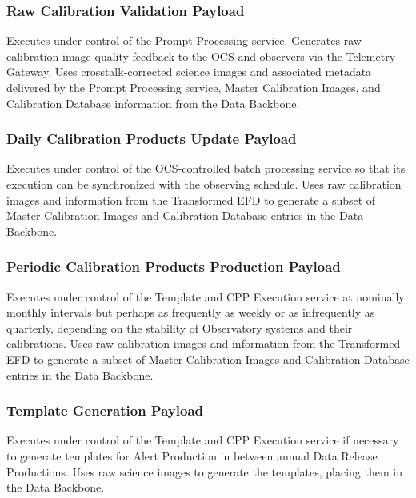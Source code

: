 \documentclass[]{article}
\begin{document}
\subsubsection{Raw Calibration Validation
Payload}\label{raw-calibration-validation-payload}

Executes under control of the Prompt Processing service. Generates raw
calibration image quality feedback to the OCS and observers via the
Telemetry Gateway. Uses crosstalk-corrected science images and
associated metadata delivered by the Prompt Processing service, Master
Calibration Images, and Calibration Database information from the Data
Backbone.

\subsubsection{Daily Calibration Products Update
Payload}\label{daily-calibration-products-update-payload}

Executes under control of the OCS-controlled batch processing service so
that its execution can be synchronized with the observing schedule. Uses
raw calibration images and information from the Transformed EFD to
generate a subset of Master Calibration Images and Calibration Database
entries in the Data Backbone.

\subsubsection{Periodic Calibration Products Production
Payload}\label{periodic-calibration-products-production-payload}

Executes under control of the Template and CPP Execution service at
nominally monthly intervals but perhaps as frequently as weekly or as
infrequently as quarterly, depending on the stability of Observatory
systems and their calibrations. Uses raw calibration images and
information from the Transformed EFD to generate a subset of Master
Calibration Images and Calibration Database entries in the Data
Backbone.

\subsubsection{Template Generation
Payload}\label{template-generation-payload}

Executes under control of the Template and CPP Execution service if
necessary to generate templates for Alert Production in between annual
Data Release Productions. Uses raw science images to generate the
templates, placing them in the Data Backbone.
\end{document}
